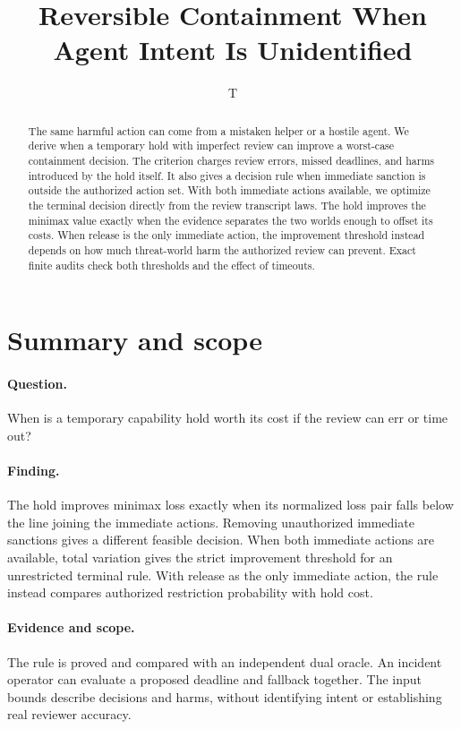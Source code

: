 \documentclass[11pt]{article}
\title{Reversible Containment When Agent Intent Is Unidentified}
\author{T}
\date{}
\begin{document}
\maketitle
\begin{abstract}
The same harmful action can come from a mistaken helper or a
hostile agent. We derive when a temporary hold with imperfect
review can improve a worst-case containment decision. The
criterion charges review errors, missed deadlines, and harms
introduced by the hold itself. It also gives a decision rule
when immediate sanction is outside the authorized action set.
With both immediate actions available, we optimize the terminal
decision directly from the review transcript laws. The hold improves
the minimax value exactly when the evidence separates the two
worlds enough to offset its costs. When release is the only
immediate action, the improvement threshold instead depends on
how much threat-world harm the authorized review can prevent.
Exact finite audits check both thresholds and the effect of timeouts.
\end{abstract}

\section*{Summary and scope}
\paragraph{Question.} When is a temporary capability hold worth its cost
if the review can err or time out?
\paragraph{Finding.} The hold improves minimax loss exactly when its
normalized loss pair falls below the line joining the immediate actions.
Removing unauthorized immediate sanctions gives a different feasible
decision. When both immediate actions are available, total
variation gives the strict improvement threshold for an unrestricted
terminal rule. With release as the only immediate action, the rule
instead compares authorized restriction probability with hold cost.
\paragraph{Evidence and scope.} The rule is proved and compared
with an independent dual oracle. An incident operator can evaluate a
proposed deadline and fallback together. The input bounds describe
decisions and harms, without identifying intent or establishing real
reviewer accuracy.
\end{document}
